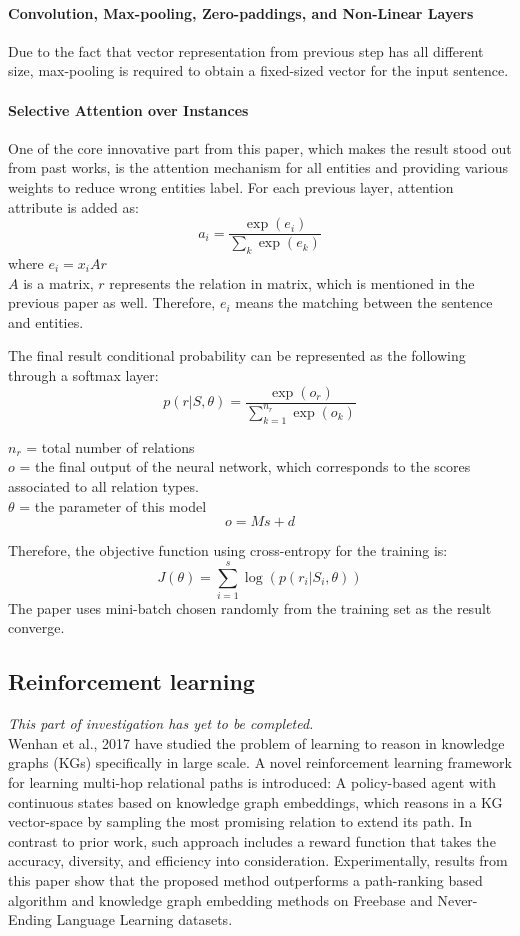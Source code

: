 \documentclass{article}
\begin{document}
	\paragraph{Convolution, Max-pooling, Zero-paddings, and Non-Linear Layers}
	Due to the fact that vector representation from previous step has all different size, max-pooling is required to obtain a fixed-sized vector for the input sentence.
	
	\paragraph{Selective Attention over Instances}
	One of the core innovative part from this paper, which makes the result stood out from past works, is the attention mechanism for all entities and providing various weights to reduce wrong entities label. For each previous layer, attention attribute is added as:
	\[a_i = \frac{\exp(e_i)}{\displaystyle\sum_{k} \exp(e_k)}\]
	where \(e_i = x_i A r\) \\
	\(A\) is a matrix, \(r\) represents the relation in matrix, which is mentioned in the previous paper as well. Therefore, \(e_i\) means the matching between the sentence and entities.
	
	The final result conditional probability can be represented as the following through a softmax layer:
	\[p(r|S, \theta) = \frac{\exp(o_r)}{\displaystyle\sum_{k=1}^{n_r} \exp(o_k)}\]

	\(n_r\) = total number of relations \\
	\(o\) = the final output of the neural network, which corresponds to the scores associated to all relation types. \\
	\(\theta\) = the parameter of this model \\
	\[o = Ms + d\]	

	Therefore, the objective function using cross-entropy for the training is:
	\[J(\theta) = \displaystyle\sum_{i=1}^{s} \log(p(r_i|S_i, \theta)) \]
	The paper uses mini-batch chosen randomly from the training set as the result converge.
	
\subsection{Reinforcement learning}	
	\textit{This part of investigation has yet to be completed.} \\
	Wenhan et al., 2017 have studied the problem of learning to reason in knowledge graphs (KGs) specifically in large scale. A novel reinforcement learning framework for learning multi-hop relational paths is introduced: A policy-based agent with continuous states based on knowledge graph embeddings, which reasons in a KG vector-space by sampling the most promising relation to extend its path. In contrast to prior work, such approach includes a reward function that takes the accuracy, diversity, and efficiency into consideration. Experimentally, results from this paper show that the proposed method outperforms a path-ranking based algorithm and knowledge graph embedding methods on Freebase and Never-Ending Language Learning datasets.
	
\end{document}
